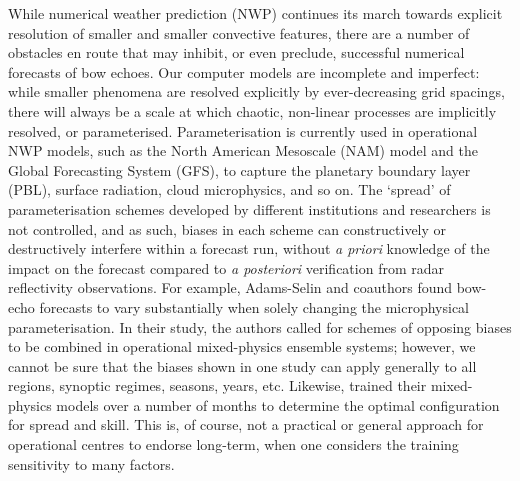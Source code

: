 \documentclass{ametsoc}
\begin{document}
While numerical weather prediction (NWP) continues its march towards explicit resolution of smaller and smaller convective features, there are a number of obstacles en route that may inhibit, or even preclude, successful numerical forecasts of bow echoes. Our computer models are incomplete and imperfect: while smaller phenomena are resolved explicitly by ever-decreasing grid spacings, there will always be a scale at which chaotic, non-linear processes are implicitly resolved, or parameterised. Parameterisation is currently used in operational NWP models, such as the North American Mesoscale (NAM) model and the Global Forecasting System (GFS), to capture the planetary boundary layer (PBL), surface radiation, cloud microphysics, and so on. The ‘spread’ of parameterisation schemes developed by different institutions and researchers is not controlled, and as such, biases in each scheme can constructively or destructively interfere within a forecast run, without {\it a priori} knowledge of the impact on the forecast compared to {\it a posteriori} verification from radar reflectivity observations. For example, Adams-Selin and coauthors \citeyearpar{Adams-Selin2013-om} found bow-echo forecasts to vary substantially when solely changing the microphysical parameterisation. In their study, the authors called for schemes of opposing biases to be combined in operational mixed-physics ensemble systems; however, we cannot be sure that the biases shown in one study can apply generally to all regions, synoptic regimes, seasons, years, etc. Likewise, \citet{Berner2011-pd} trained their mixed-physics models over a number of months to determine the optimal configuration for spread and skill. This is, of course, not a practical or general approach for operational centres to endorse long-term, when one considers the training sensitivity to many factors.
\end{document}
